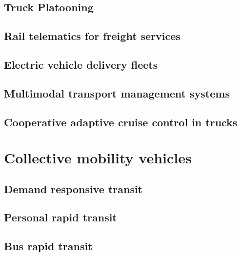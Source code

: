 \documentclass[
]{book}
\begin{document}
\hypertarget{truck-platooning}{%
\section{Truck Platooning}\label{truck-platooning}}

\hypertarget{rail-telematics-for-freight-services}{%
\section{Rail telematics for freight services}\label{rail-telematics-for-freight-services}}

\hypertarget{electric-vehicle-delivery-fleets}{%
\section{Electric vehicle delivery fleets}\label{electric-vehicle-delivery-fleets}}

\hypertarget{multimodal-transport-management-systems}{%
\section{Multimodal transport management systems}\label{multimodal-transport-management-systems}}

\hypertarget{cooperative-adaptive-cruise-control-in-trucks}{%
\section{Cooperative adaptive cruise control in trucks}\label{cooperative-adaptive-cruise-control-in-trucks}}

\hypertarget{collective}{%
\chapter{Collective mobility vehicles}\label{collective}}

\hypertarget{demand-responsive-transit}{%
\section{Demand responsive transit}\label{demand-responsive-transit}}

\hypertarget{personal-rapid-transit}{%
\section{Personal rapid transit}\label{personal-rapid-transit}}

\hypertarget{bus-rapid-transit}{%
\section{Bus rapid transit}\label{bus-rapid-transit}}
\end{document}
